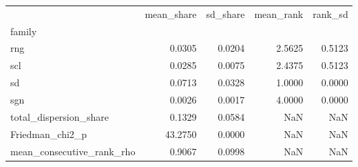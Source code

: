 \begin{tabular}{lrrrr}
\toprule
 & mean_share & sd_share & mean_rank & rank_sd \\
family &  &  &  &  \\
\midrule
rng & 0.0305 & 0.0204 & 2.5625 & 0.5123 \\
scl & 0.0285 & 0.0075 & 2.4375 & 0.5123 \\
sd & 0.0713 & 0.0328 & 1.0000 & 0.0000 \\
sgn & 0.0026 & 0.0017 & 4.0000 & 0.0000 \\
total_dispersion_share & 0.1329 & 0.0584 & NaN & NaN \\
Friedman_chi2_p & 43.2750 & 0.0000 & NaN & NaN \\
mean_consecutive_rank_rho & 0.9067 & 0.0998 & NaN & NaN \\
\bottomrule
\end{tabular}
